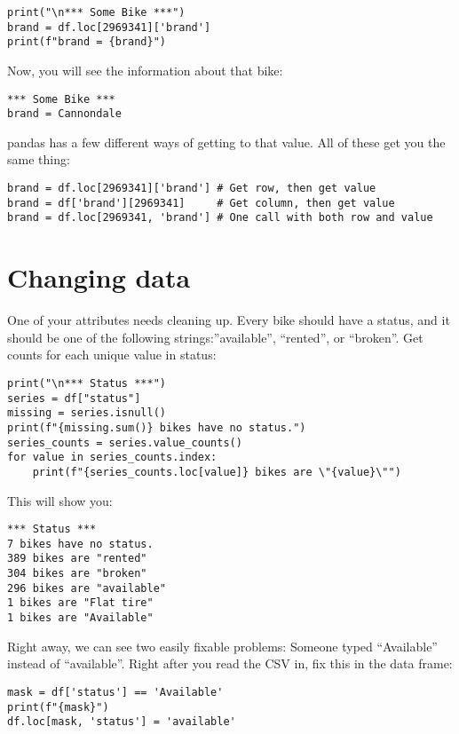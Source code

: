 \begin{Verbatim}
print("\n*** Some Bike ***")
brand = df.loc[2969341]['brand']
print(f"brand = {brand}")
\end{Verbatim}

Now, you will see the information about that bike:

\begin{Verbatim}
*** Some Bike ***
brand = Cannondale
\end{Verbatim}

pandas has a few different ways of getting to that value.  All of these get you the same thing:
\begin{Verbatim}
brand = df.loc[2969341]['brand'] # Get row, then get value
brand = df['brand'][2969341]     # Get column, then get value
brand = df.loc[2969341, 'brand'] # One call with both row and value
\end{Verbatim}

\section{Changing data}

One of your attributes needs cleaning up. Every bike should have a
status, and it should be one of the following strings:''available'',
``rented'', or ``broken''.  Get counts for each unique value in
status:

\begin{Verbatim}
print("\n*** Status ***")
series = df["status"]
missing = series.isnull()
print(f"{missing.sum()} bikes have no status.")
series_counts = series.value_counts()
for value in series_counts.index:
    print(f"{series_counts.loc[value]} bikes are \"{value}\"")
\end{Verbatim}

This will show you:

\begin{Verbatim}
*** Status ***
7 bikes have no status.
389 bikes are "rented"
304 bikes are "broken"
296 bikes are "available"
1 bikes are "Flat tire"
1 bikes are "Available"
\end{Verbatim}

Right away, we can see two easily fixable problems: Someone typed
``Available'' instead of ``available''.  Right after you read the CSV
in, fix this in the data frame:

\begin{Verbatim}
mask = df['status'] == 'Available'
print(f"{mask}")
df.loc[mask, 'status'] = 'available'
\end{Verbatim}

